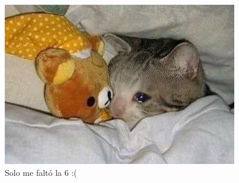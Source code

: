 \documentclass[11pt,letterpaper]{article}
\begin{document}
\begin{figure}[H]
    \centering
    \includegraphics[scale=0.5]{gato.jpg}
    \caption{Solo me faltó la 6 :(}
\end{figure}




\end{document}
